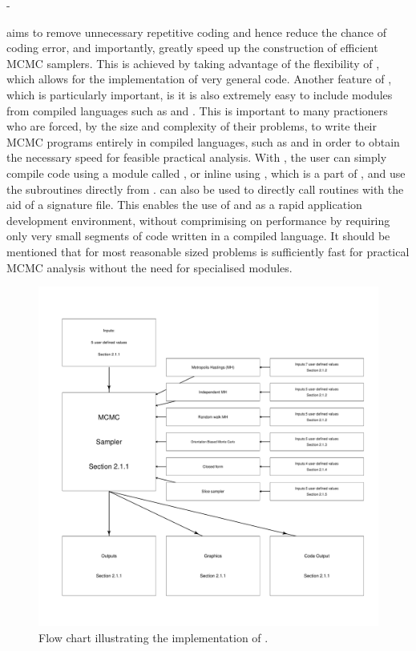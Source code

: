-\documentclass[article]{jss}
\begin{document}
 aims to remove unnecessary repetitive coding and hence
reduce the chance of coding error, and importantly, greatly speed up
the construction of efficient MCMC samplers. This is achieved by
taking advantage of the flexibility of , which allows
for the implementation of very general code. Another feature of
, which is particularly important, is it is also
extremely easy to include modules from compiled languages such as
 and . This is important to many
practioners who are forced, by the size and complexity of their
problems, to write their MCMC programs entirely in compiled languages,
such as  and  in order to obtain the
necessary speed for feasible practical analysis. With
, the user can simply compile  code
using a module called  \citep{F2PY}, or inline 
using , which is a part of  \citep{NumpyScipy},
and use the subroutines directly from . 
can also be used to directly call  routines with the aid
of a  signature file. This enables the use of
 and  as a rapid application development
environment, without comprimising on performance by requiring only very
small segments of code written in a compiled language. It should be
mentioned that for most reasonable sized problems  is
sufficiently fast for practical MCMC analysis without the need for
specialised modules.

%
\begin{figure}[t!]
  \begin{center}
\hspace*{-1cm}\includegraphics[width=18cm]{flowchart.pdf}    
\end{center}
\caption{Flow chart illustrating the implementation of
  .\label{fig:Flow-chart-ofPyMCMC}}

\end{figure}
\end{document}
